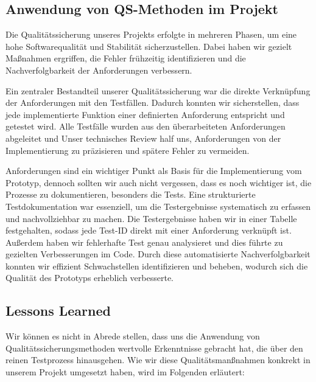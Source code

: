 \subsection{Anwendung von QS-Methoden im Projekt}

Die Qualitätssicherung unseres Projekts erfolgte in mehreren Phasen, um eine hohe Softwarequalität und Stabilität sicherzustellen. 
Dabei haben wir gezielt Maßnahmen ergriffen, die Fehler frühzeitig identifizieren und die Nachverfolgbarkeit der Anforderungen verbessern.\par

Ein zentraler Bestandteil unserer Qualitätssicherung war die direkte Verknüpfung der Anforderungen mit den Testfällen.
Dadurch konnten wir sicherstellen, dass jede implementierte Funktion einer definierten Anforderung entspricht und getestet wird.
Alle Testfälle wurden aus den überarbeiteten Anforderungen abgeleitet und Unser technisches Review half uns, Anforderungen von der Implementierung zu präzisieren und spätere Fehler zu vermeiden.\par

Anforderungen sind ein wichtiger Punkt als Basis für die Implementierung vom Prototyp, dennoch sollten wir auch nicht vergessen, dass es noch wichtiger ist, die Prozesse zu dokumentieren, besonders die Tests. 
Eine strukturierte Testdokumentation war essenziell, um die Testergebnisse systematisch zu erfassen und nachvollziehbar zu machen.
Die Testergebnisse haben wir in einer Tabelle festgehalten, sodass jede Test-ID direkt mit einer Anforderung verknüpft ist. Außerdem haben wir fehlerhafte Test genau analysieret und dies führte zu gezielten Verbesserungen im Code.
Durch diese automatisierte Nachverfolgbarkeit konnten wir effizient Schwachstellen identifizieren und beheben, wodurch sich die Qualität des Prototyps erheblich verbesserte.\par

\subsection{Lessons Learned}

Wir können es nicht in Abrede stellen, dass uns die Anwendung von Qualitätssicherungsmethoden wertvolle Erkenntnisse gebracht hat, die über den reinen Testprozess hinausgehen.
Wie wir diese Qualitätsmanßnahmen konkrekt in unserem Projekt umgesetzt haben, wird im Folgenden erläutert:

